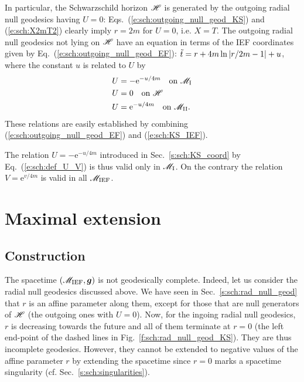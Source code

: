 In particular, the Schwarzschild horizon $\mathscr{H}$ is generated by the
outgoing radial null geodesics having $U=0$:
Eqs.~(\ref{e:sch:outgoing_null_geod_KS}) and (\ref{e:sch:X2mT2})
clearly imply $r=2m$ for $U=0$, i.e. $X=T$.
 The outgoing radial null geodesics not lying on $\mathscr{H}$ have an equation
in terms of the IEF coordinates given by
Eq.~(\ref{e:sch:outgoing_null_geod_EF}):
${\tilde t} = r + 4 m \ln \left|r/2m- 1 \right| + u$,
where the constant $u$ is related to $U$ by
\begin{subequations}
\begin{align}
 & U = - \mathrm{e}^{-u/4m} \quad \mbox{on}\ \mathscr{M}_{\rm I} \\
 & U = 0 \quad \mbox{on}\ \mathscr{H} \\
 & U =  \mathrm{e}^{-u/4m} \quad \mbox{on}\ \mathscr{M}_{\rm II} .
\end{align}
\end{subequations}
These relations are easily established by combining
(\ref{e:sch:outgoing_null_geod_EF}) and (\ref{e:sch:KS_IEF}).


\begin{remark}
The relation $U = - \mathrm{e}^{-u/4m}$ introduced in Sec.~\ref{s:sch:KS_coord}
by Eq.~(\ref{e:sch:def_U_V}) is thus valid only in $\mathscr{M}_{\rm I}$. On the
contrary the relation $V = \mathrm{e}^{v/4m}$ is valid in all $\mathscr{M}_{\rm IEF}$.
\end{remark}

\section{Maximal extension} \label{s:sch:max_extens}

\subsection{Construction} \label{s:sch:max_extens_constr}

The spacetime $(\mathscr{M}_{\rm IEF}, \bm{g})$ is not geodesically complete.
Indeed, let us consider the radial null geodesics discussed above.
We have seen in Sec.~\ref{s:sch:rad_null_geod} that $r$ is an affine parameter
along them, except for those that are null generators of $\mathscr{H}$
(the outgoing ones with $U=0$).
Now, for the ingoing radial null geodesics, $r$ is decreasing towards the
future and all of them terminate at $r=0$ (the left end-point of the dashed
lines in Fig.~\ref{f:sch:rad_null_geod_KS}).
They are thus incomplete geodesics. However, they cannot be extended to
negative values of the affine parameter $r$ by extending the spacetime
since $r=0$ marks a spacetime singularity (cf. Sec.~\ref{s:sch:singularities}).

